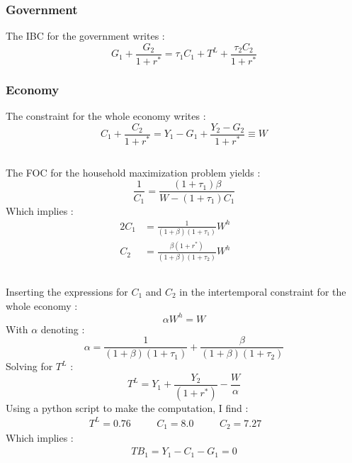 \documentclass{article}
\begin{document}
\subsubsection*{Government}
The IBC for the government writes :
\begin{equation}
    G_1 + \frac{G_2}{1+r^*} = \tau_1 C_1 + T^L + \frac{\tau_2 C_2}{1+r^*}
\end{equation}
\subsubsection*{Economy}
The constraint for the whole economy writes :
\begin{equation}
    C_1 + \frac{C_2}{1+r^*} = Y_1 - G_1 + \frac{Y_2 - G_2}{1+r^*} \equiv W
\end{equation}
\subsection{}
The FOC for the household maximization problem yields :
\begin{equation}
    \frac{1}{C_1} = \frac{(1 + \tau_1)\beta}{W - (1 + \tau_1)C_1}
\end{equation}
Which implies :
\begin{alignat}{2}
    C_1 &= \frac{1}{(1+\beta)(1+\tau_1)}W^h &\quad\\
    C_2 &= \frac{\beta(1+r^*)}{(1+\beta)(1+\tau_2)}W^h &\quad 
\end{alignat}
\subsection{}
Inserting the expressions for $C_1$ and $C_2$ in the intertemporal constraint for the whole economy :
\begin{equation}
    \alpha W^h = W
\end{equation}
With $\alpha$ denoting :
\begin{equation}
    \alpha = \frac{1}{(1+\beta)(1+\tau_1)} + \frac{\beta}{(1+\beta)(1+\tau_2)}
\end{equation}
Solving for $T^L$ :
\begin{equation}
    T^L = Y_1 + \frac{Y_2}{(1+r^*)} - \frac{W}{\alpha}
\end{equation}
Using a python script to make the computation, I find :
\begin{align*}
    T^L = 0.76  && \quad
    C_1 = 8.0 &&\quad
    C_2 = 7.27 &\quad 
\end{align*}
Which implies :
\begin{align*}
    TB_1 = Y_1 - C_1 - G_1 = 0 
\end{align*}
\end{document}
